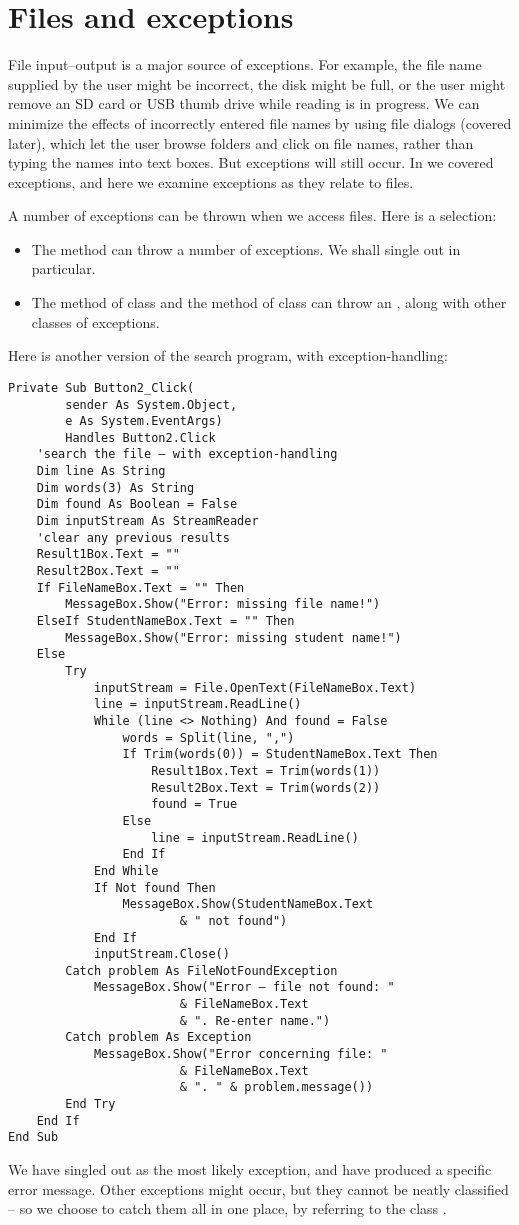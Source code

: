 	\section{Files and exceptions}
	File input–output is a major source of exceptions. For example, the file name supplied by the user might be incorrect, the disk might be full, or the user might remove an SD card or USB thumb drive while reading is in progress. We can minimize the effects of incorrectly entered file names by using file dialogs (covered later), which let the user browse folders and click on file names, rather than typing the names into text boxes. But exceptions will still occur. In  we covered exceptions, and here we examine exceptions as they relate to files.
		
		A number of exceptions can be thrown when we access files. Here is a selection:
		\begin{itemize}
      \item The  method can throw a number of exceptions. We shall single out  in particular.
      \item The  method of class  and the  method of class  can throw an , along with other classes of exceptions.
		\end{itemize}
		Here is another version of the search program, with exception-handling:
		\begin{lstlisting}
Private Sub Button2_Click(
		sender As System.Object,
		e As System.EventArgs)
		Handles Button2.Click
	'search the file – with exception-handling
	Dim line As String
	Dim words(3) As String
	Dim found As Boolean = False
	Dim inputStream As StreamReader
	'clear any previous results
	Result1Box.Text = ""
	Result2Box.Text = ""
	If FileNameBox.Text = "" Then
		MessageBox.Show("Error: missing file name!")
	ElseIf StudentNameBox.Text = "" Then
		MessageBox.Show("Error: missing student name!")
	Else
		Try
			inputStream = File.OpenText(FileNameBox.Text)
			line = inputStream.ReadLine()
			While (line <> Nothing) And found = False
				words = Split(line, ",")
				If Trim(words(0)) = StudentNameBox.Text Then
					Result1Box.Text = Trim(words(1))
					Result2Box.Text = Trim(words(2))
					found = True
				Else
					line = inputStream.ReadLine()
				End If
			End While
			If Not found Then
				MessageBox.Show(StudentNameBox.Text
						& " not found")
			End If
			inputStream.Close()
		Catch problem As FileNotFoundException
			MessageBox.Show("Error – file not found: "
						& FileNameBox.Text
						& ". Re-enter name.")
		Catch problem As Exception
			MessageBox.Show("Error concerning file: "
						& FileNameBox.Text
						& ". " & problem.message())
		End Try
	End If
End Sub
		\end{lstlisting}
		We have singled out  as the most likely exception, and have produced a specific error message. Other exceptions might occur, but they cannot be neatly classified – so we choose to catch them all in one place, by referring to the class .


